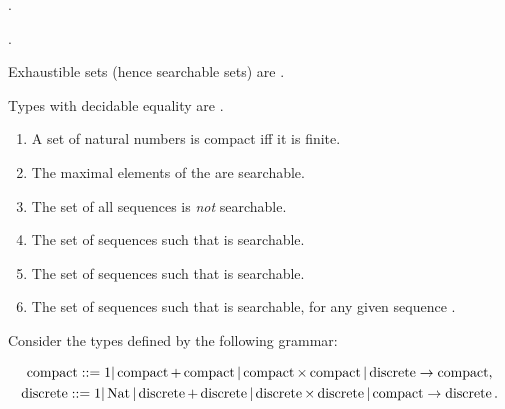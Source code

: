 \documentclass%
[%
Screen4to3,
]{foils}
\begin{document}
\qquad \qquad {}.

\qquad \qquad {}.


Exhaustible sets (hence searchable sets) are .

\vfill

Types with decidable equality are .


\begin{enumerate}
\item[\grey{1.}] 
A set of natural numbers is compact iff it is finite.

\item[\grey{2.}]
The maximal elements of the  are searchable. 


\item[\grey{3.}]
The set of all sequences \darkblue{$\alpha \colon \Nat \to \Nat$} is \emph{not}
searchable.

\item[\grey{4.}]
The set of sequences \darkblue{$\alpha \colon \Nat \to \Nat$} such that 
 is searchable. 

\item[\grey{5.}]
The set of sequences \darkblue{$\alpha \colon \Nat \to \Nat$} such that 
 is searchable. 

\item[\grey{6.}]  The set of sequences \darkblue{$\alpha \colon \Nat
    \to \Nat$} such that  is searchable, for
  any given sequence \darkblue{$\beta \colon \Nat \to \Nat$}.

  \end{enumerate}


\newcommand{\compact}{\operatorname{compact}}
\newcommand{\discrete}{\operatorname{discrete}}

Consider the types defined by the following grammar:

\begin{gather*}
  \compact  ::=  1 | \compact + \compact | \compact \times \compact | \discrete \to \compact, \\
  \discrete  ::=  1 | \Nat | \discrete + \discrete | \discrete \times \discrete | \compact \to \discrete.
\end{gather*}
\end{document}
